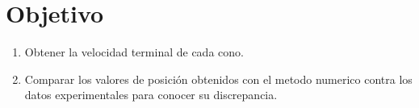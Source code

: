\section{Objetivo}

\begin{enumerate}
    \item Obtener la velocidad terminal de cada cono.
    \item Comparar los valores de posición obtenidos con
        el metodo numerico contra los datos experimentales 
        para conocer su discrepancia.
\end{enumerate}
